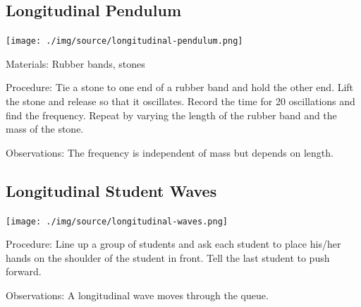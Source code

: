 \begin{multicols}{2}
\subsection{Longitudinal Pendulum}

\begin{center}
\texttt{[image: ./img/source/longitudinal-pendulum.png]}
\end{center}

\begin{description*}
\item[Materials:]{Rubber bands, stones}
\item[Procedure:]{Tie a stone to one end of a rubber band and hold the other end. Lift the stone and release so that it oscillates. Record the time for 20 oscillations and find the frequency. Repeat by varying the length of the rubber band and the mass of the stone.}
\item[Observations:]{The frequency is independent of mass but depends on length.}
\end{description*}

\subsection{Longitudinal Student Waves}

\begin{center}
\texttt{[image: ./img/source/longitudinal-waves.png]}
\end{center}

\begin{description*}
\item[Procedure:]{Line up a group of students and ask each student to place his/her hands on the shoulder of the student in front. Tell the last student to push forward.}
\item[Observations:]{A longitudinal wave moves through the queue.}
\end{description*}


\end{multicols}
